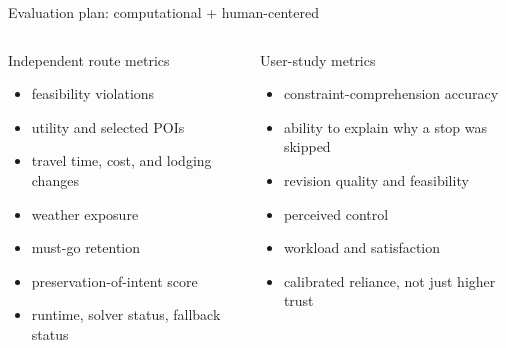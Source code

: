 \documentclass[aspectratio=169,10pt]{beamer}
\newcommand{\smallcite}[1]{\vspace{0.15em}{\footnotesize\textcolor{DarkGray}{#1}}}
\begin{document}
\begin{frame}{Evaluation plan: computational + human-centered}
\begin{columns}[T,onlytextwidth]
\begin{block}{Independent route metrics}
\begin{itemize}
  \item feasibility violations
  \item utility and selected POIs
  \item travel time, cost, and lodging changes
  \item weather exposure
  \item must-go retention
  \item preservation-of-intent score
  \item runtime, solver status, fallback status
\end{itemize}
\smallcite{TravelEval and TripScore-style complete-plan evaluation}
\end{block}

\begin{block}{User-study metrics}
\begin{itemize}
  \item constraint-comprehension accuracy
  \item ability to explain why a stop was skipped
  \item revision quality and feasibility
  \item perceived control
  \item workload and satisfaction
  \item calibrated reliance, not just higher trust
\end{itemize}
\smallcite{HCI / XAI evaluation: Amershi, Bucinca, Knijnenburg, Chatti}
\end{block}
\end{columns}
\end{frame}
\end{document}
